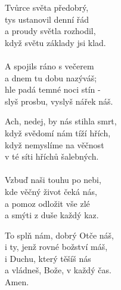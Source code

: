 \begin{translatioMulticol}{3}
Tvůrce světa předobrý,\\
tys ustanovil denní řád\\
a proudy světla rozhodil,\\
když světu základy jsi klad.\\
\\
A spojils ráno s večerem\\
a dnem tu dobu nazýváš;\\
hle padá temné noci stín -\\
slyš prosbu, vyslyš nářek náš.\columnbreak

Ach, nedej, by nás stihla smrt,\\
když svědomí nám tíží hřích,\\
když nemyslíme na věčnost\\
v té síti hříchů šalebných.\\
\\
Vzbuď naši touhu po nebi,\\
kde věčný život čeká nás,\\
a pomoz odložit vše zlé\\
a smýti z duše každý kaz.\columnbreak

To splň nám, dobrý Otče náš,\\
i ty, jenž rovné božství máš,\\
i Duchu, který těšíš nás\\
a vládneš, Bože, v každý čas.\\
Amen. 
\end{translatioMulticol}
